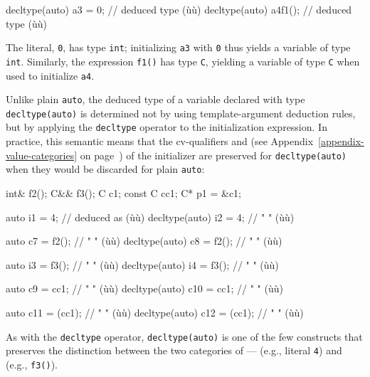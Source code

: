 \begin{emcppslisting}[emcppsbatch=e1,emcppsstandards={c++14}]
decltype(auto) a3 = 0;    // deduced type (ù{}ù)
decltype(auto) a4{f1()};  // deduced type (ù{}ù)
\end{emcppslisting}
    

The literal, \lstinline!0!, has type \lstinline!int!; initializing \lstinline!a3!
with \lstinline!0! thus yields a variable of type \lstinline!int!. Similarly,
the expression \lstinline!f1()! has type \lstinline!C!, yielding a variable of
type \lstinline!C! when used to initialize \lstinline!a4!.

Unlike plain \lstinline!auto!, the deduced type of a variable declared with
type \lstinline!decltype(auto)! is determined not by using
template-argument deduction rules, but by applying the \lstinline!decltype!
operator to the initialization expression. In practice, this semantic
means that the cv-qualifiers and  (see Appendix~\ref{appendix-value-categories} on page~\pageref{appendix-value-categories}) of the initializer are
preserved for \lstinline!decltype(auto)! when they would be discarded for
plain \lstinline!auto!:

\begin{emcppslisting}[emcppsbatch=e1]
int&    f2();
C&&     f3();
C       c1;
const C cc1;
C*      p1 = &c1;

auto           i1  = 4;      // deduced as (ù{}ù)
decltype(auto) i2  = 4;      //    "     " (ù{}ù)

auto           c7  = f2();   //    "     " (ù{}ù)
decltype(auto) c8  = f2();   //    "     " (ù{}ù)

auto           i3  = f3();   //    "     " (ù{}ù)
decltype(auto) i4  = f3();   //    "     " (ù{}ù)

auto           c9  = cc1;    //    "     " (ù{}ù)
decltype(auto) c10 = cc1;    //    "     " (ù{}ù)

auto           c11 = (cc1);  //    "     " (ù{}ù)
decltype(auto) c12 = (cc1);  //    "     " (ù{}ù)
\end{emcppslisting}
    

As with the \lstinline!decltype! operator, \lstinline!decltype(auto)! is one
of the few constructs that preserves the distinction between the two
categories of  ---  (e.g., literal
\lstinline!4!) and  (e.g., \lstinline!f3()!).

